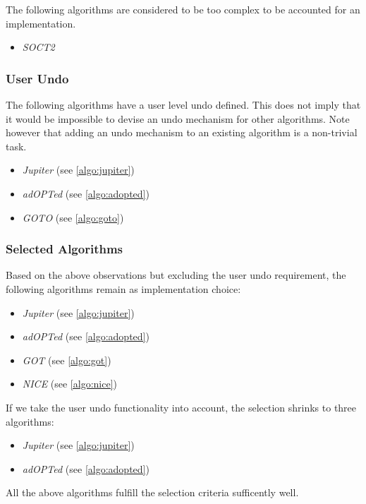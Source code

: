 The following algorithms are considered to be too complex to be accounted for an implementation.
\begin{itemize}
 \item \emph{SOCT2}
\end{itemize}


\subsubsection{User Undo}
The following algorithms have a user level undo defined. This does not imply that it would be impossible to devise an undo mechanism for other algorithms. Note however that adding an undo mechanism to an existing algorithm is a non-trivial task.

\begin{itemize}
 \item \emph{Jupiter} (see \ref{algo:jupiter}) 
 \item \emph{adOPTed} (see \ref{algo:adopted})
 \item \emph{GOTO} (see \ref{algo:goto})
\end{itemize}


\subsubsection{Selected Algorithms}
Based on the above observations but excluding the user undo requirement, the following algorithms remain as implementation choice:

\begin{itemize}
 \item \emph{Jupiter} (see \ref{algo:jupiter})
 \item \emph{adOPTed} (see \ref{algo:adopted})
 \item \emph{GOT} (see \ref{algo:got})
 \item \emph{NICE} (see \ref{algo:nice})
\end{itemize}

If we take the user undo functionality into account, the selection shrinks to three algorithms:
\begin{itemize}
 \item \emph{Jupiter} (see \ref{algo:jupiter}) 
 \item \emph{adOPTed} (see \ref{algo:adopted})
\end{itemize}

All the above algorithms fulfill the selection criteria sufficently well.
